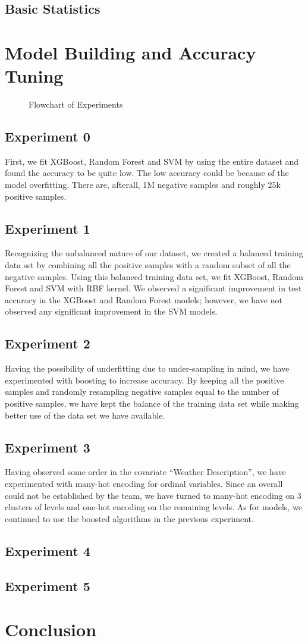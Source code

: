 \documentclass[10pt]{article}
\begin{document}
\subsection{Basic Statistics}

\section{Model Building and Accuracy Tuning}
\begin{figure}[H]
    \centering
    
    \caption{Flowchart of Experiments}
\end{figure}
\subsection{Experiment 0}
First, we fit XGBoost, Random Forest and SVM by using the entire dataset
and found the accuracy to be quite low. The low accuracy could be because
of the model overfitting. There are, afterall, 1M negative samples and
roughly 25k positive samples.\par
\subsection{Experiment 1}
Recognizing the unbalanced nature of our dataset, we created a balanced
training data set by combining all the positive samples with a random
subset of all the negative samples. Using this balanced training data set,
we fit XGBoost, Random Forest and SVM with RBF kernel. We observed a
significant improvement in test accuracy in the XGBoost and Random Forest
models; however, we have not observed any significant improvement in the
SVM models.\par
\subsection{Experiment 2}
Having the possibility of underfitting due to under-sampling in mind, we
have experimented with boosting to increase accuracy. By keeping all the
positive samples and randomly resampling negative samples equal to the
number of positive samples, we have kept the balance of the training data
set while making better use of the data set we have available.\par
\subsection{Experiment 3}
Having observed some order in the covariate ``Weather Description'', we
have experimented with many-hot encoding for ordinal variables. Since an
overall could not be established by the team, we have turned to many-hot
encoding on 3 clusters of levels and one-hot encoding on the remaining
levels. As for models, we continued to use the boosted algorithms in the
previous experiment.\par
\subsection{Experiment 4}
\subsection{Experiment 5}

\section{Conclusion}
\end{document}
